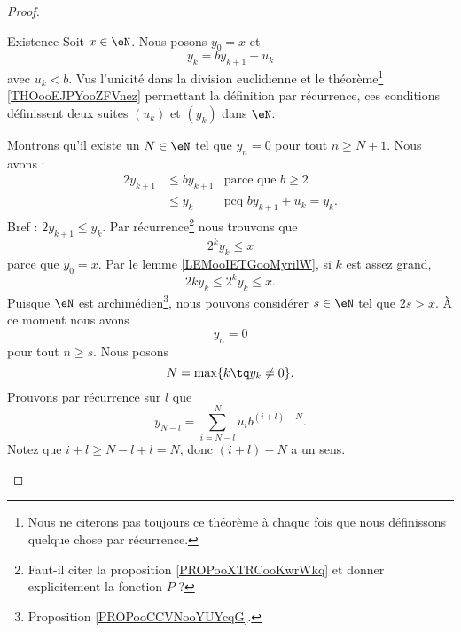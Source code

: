 \begin{proof}
\begin{subproof}
    \item[Existence]
        Soit \( x\in \eN\). Nous posons \( y_0=x\) et 
        \begin{equation}
            y_k=by_{k+1}+u_k
        \end{equation}
        avec \( u_k<b\). Vus l'unicité dans la division euclidienne et le théorème\footnote{Nous ne citerons pas toujours ce théorème à chaque fois que nous définissons quelque chose par récurrence.} \ref{THOooEJPYooZFVnez} permettant la définition par récurrence, ces conditions définissent deux suites \( (u_k)\) et \( (y_k)\) dans \( \eN\).

        Montrons qu'il existe un \( N\in \eN\) tel que \( y_n=0\) pour tout \( n\geq N+1\). Nous avons :
        \begin{subequations}
            \begin{align}
                2y_{k+1}&\leq b y_{k+1}      &\text{parce que } b\geq 2\\
                &\leq y_k           &\text{pcq }by_{k+1}+u_k=y_k.
            \end{align}
        \end{subequations}
        Bref : \( 2y_{k+1}\leq y_k\). Par récurrence\footnote{Faut-il citer la proposition \ref{PROPooXTRCooKwrWkq} et donner explicitement la fonction \( P\) ?} nous trouvons que
        \begin{equation}
            2^ky_k\leq x
        \end{equation}
        parce que \( y_0=x\). Par le lemme \ref{LEMooIETGooMyrilW}, si \( k\) est assez grand,
        \begin{equation}
            2ky_k\leq 2^ky_k\leq x.
        \end{equation}
        Puisque \( \eN\) est archimédien\footnote{Proposition \ref{PROPooCCVNooYUYcqG}.}, nous pouvons considérer \( s\in \eN\) tel que \( 2s>x\). À ce moment nous avons
        \begin{equation}
            y_n=0
        \end{equation}
        pour tout \( n\geq s\). Nous posons
        \begin{equation}
            N=\max\{ k\tq y_k\neq 0 \}.
        \end{equation}
        Prouvons par récurrence sur \( l\) que
        \begin{equation}        \label{EQooZBKQooFqcckr}
         y_{N-l}=\sum_{i=N-l}^Nu_ib^{(i+l)-N}.
        \end{equation}
        Notez que \( i+l\geq N-l+l=N\), donc \( (i+l)-N\) a un sens.

\end{subproof}
\end{proof}

